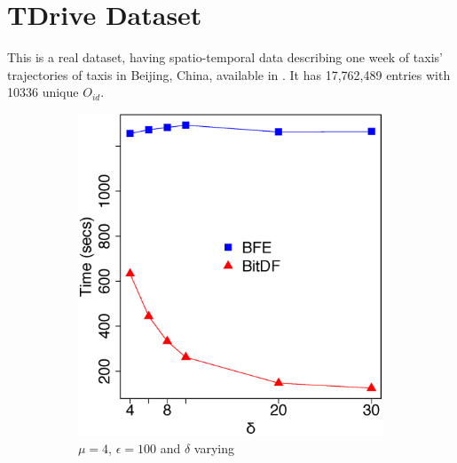 \section{TDrive Dataset}
\label{subsec:tdrive}
This is a real dataset, having spatio-temporal data describing one week of taxis' trajectories of taxis in Beijing,
China, available in \citep{tdrive}. It has 17,762,489 entries with 10336 unique $O_{id}$.

\begin{figure}[h!]
    \centering
    \begin{subfigure}[t]{0.48\textwidth}
        \includegraphics[width=\textwidth]{images/TDrive_n_4_g_100_varying_l.eps}
        \caption{$\mu = 4$, $\epsilon = 100$ and $\delta$ varying}
        \label{fig:tdrive_vary_l}
    \end{subfigure}
    \begin{subfigure}[t]{0.48\textwidth}

\end{subfigure}
\end{figure}
